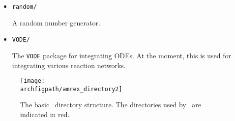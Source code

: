 \begin{itemize}
\begin{itemize}
\begin{itemize}
    \item {\tt random/}

      A random number generator.

    \item {\tt VODE/}

      The {\tt VODE} \cite{vode} package for integrating ODEs.  At the
      moment, this is used for integrating various reaction networks.
 
   \end{itemize}

  \end{itemize}

\end{itemize}


\begin{figure}[t]
\centering
\texttt{[image: \\archfigpath/amrex\_directory2]}
\caption[\amrex\ directory structure] {\label{fig:arch:amrex} The
  basic \amrex\ directory structure.  The directories used by
  \maestro\ are indicated in red.}
\end{figure}

